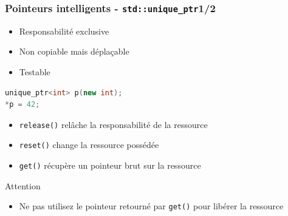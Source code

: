 \documentclass[C++.tex]{subfiles}
\begin{document}
\begin{frame}[fragile]
	\frametitle{Pointeurs intelligents - \lstinline|std::unique_ptr|\titlehfill{}1/2}
	\begin{itemize}
		\item Responsabilité exclusive
		\item Non copiable mais déplaçable
		\item Testable
	\end{itemize}

	\begin{lstlisting}[language=C++]
unique_ptr<int> p(new int);
*p = 42;\end{lstlisting}

	\begin{itemize}
		\item \lstinline|release()| relâche la responsabilité de la ressource


		\item \lstinline|reset()| change la ressource possédée


		\item \lstinline|get()| récupère un pointeur brut sur la ressource

	\end{itemize}

	\begin{alertblock}{Attention}
		\begin{itemize}
			\item Ne pas utilisez le pointeur retourné par \lstinline|get()| pour libérer la ressource
		\end{itemize}
	\end{alertblock}
\end{frame}
\end{document}
